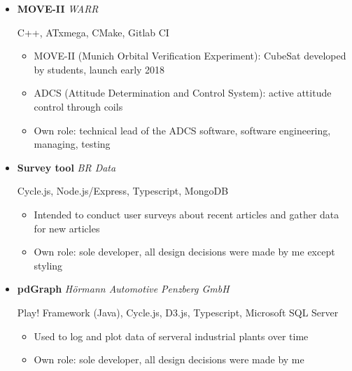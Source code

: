 \documentclass[11pt,a4paper,sans]{moderncv}        %
\begin{document}
\begin{itemize}

\item{\textbf{MOVE-II} \textit{WARR}

\small{C++, ATxmega, CMake, Gitlab CI}

\vspace{3pt}

\begin{small}
\begin{itemize}
\item{MOVE-II (Munich Orbital Verification Experiment): CubeSat developed by students, launch early 2018}
\item{ADCS (Attitude Determination and Control System): active attitude control through coils}
\item{Own role: technical lead of the ADCS software, software engineering, managing, testing}
\end{itemize}
\end{small}
}

\vspace{3pt}

\item{\textbf{Survey tool} \textit{BR Data}

\small{Cycle.js, Node.js/Express, Typescript, MongoDB}

\begin{small}
\begin{itemize}
\item{Intended to conduct user surveys about recent articles and gather data for new articles}
\item{Own role: sole developer, all design decisions were made by me except styling}
\end{itemize}
\end{small}
}

\vspace{3pt}

\item{\textbf{pdGraph} \textit{Hörmann Automotive Penzberg GmbH}

\small{Play! Framework (Java), Cycle.js, D3.js, Typescript, Microsoft SQL Server}

\begin{small}
\begin{itemize}
\item{Used to log and plot data of serveral industrial plants over time}
\item{Own role: sole developer, all design decisions were made by me}
\end{itemize}
\end{small}

}

\end{itemize}
\end{document}
